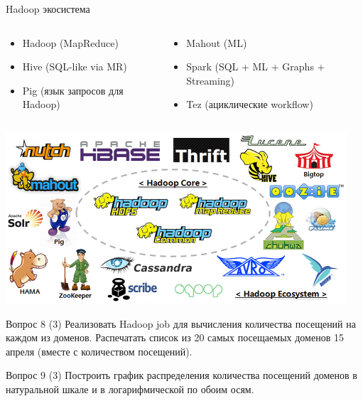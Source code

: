 \documentclass[10pt,a4paper]{beamer}
\begin{document}
\begin{frame}{Hadoop экосистема}

\begin{columns}[T]
    \begin{column}{.4\textwidth} 
	\begin{itemize}
\item Hadoop (MapReduce)
\item Hive (SQL-like via MR)
\item Pig (язык запросов для Hadoop)
\end{itemize}
    \end{column}
    \begin{column}{.6\textwidth} 
\begin{itemize}
\item Mahout (ML)
\item Spark (SQL + ML + Graphs + Streaming)
\item Tez (ациклические workflow)
\end{itemize}    
    \end{column}
\end{columns}

\begin{center}
\includegraphics[scale=0.55]{images/eco.png}
\end{center}

\end{frame}


\begin{frame}[fragile]{}

\begin{alertblock}{Вопрос 8 (3)}
Реализовать Hadoop job для вычисления количества посещений на каждом из доменов. Распечатать список из 20 самых посещаемых доменов 15 апреля (вместе с количеством посещений).
\end{alertblock}

\begin{alertblock}{Вопрос 9 (3)}
Построить график распределения количества посещений доменов в натуральной шкале и в логарифмической по обоим осям.
\end{alertblock}

\end{frame}
\end{document}
